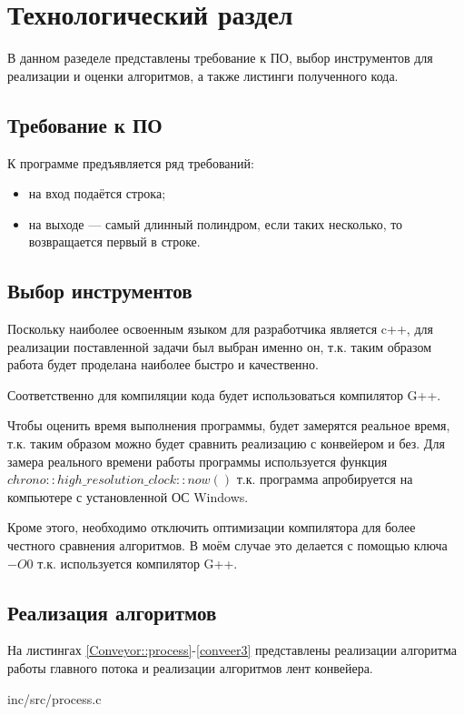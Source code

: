 \chapter{Технологический раздел}
В данном разеделе представлены требование к ПО, выбор инструментов для реализации и оценки алгоритмов, а также листинги полученного кода.

\section{Требование к ПО}

К программе предъявляется ряд требований:

\begin{itemize}
	\item на вход подаётся строка;
	\item на выходе — самый длинный полиндром, если таких несколько, то возвращается первый в строке.
\end{itemize}

\section{Выбор инструментов}
Поскольку наиболее освоенным языком для разработчика является c++, для реализации поставленной задачи был выбран именно он, т.к. таким образом работа будет проделана наиболее быстро и качественно.

Соответственно для компиляции кода будет использоваться компилятор G++.

Чтобы оценить время выполнения программы, будет замерятся реальное время, т.к. таким образом можно будет сравнить реализацию с конвейером и без. Для замера реального времени работы программы используется функция $chrono::high\_resolution\_clock::now()$ т.к. программа апробируется на компьютере с установленной ОС Windows. \cite{chrono()}

Кроме этого, необходимо отключить оптимизации компилятора для более честного сравнения алгоритмов. В моём случае это делается с помощью ключа $-O0$ т.к. используется компилятор G++. \cite{optimization}

\section{Реализация алгоритмов}
На листингах \ref{Conveyor::process}-\ref{conveer3} представлены реализации алгоритма работы главного потока и реализации алгоритмов лент конвейера.

\begin{lstinputlisting}[
	caption={Реализация алгоритма работы главного потока},
	label={Conveyor::process},
	style={c},
	]{inc/src/process.c}
\end{lstinputlisting}

